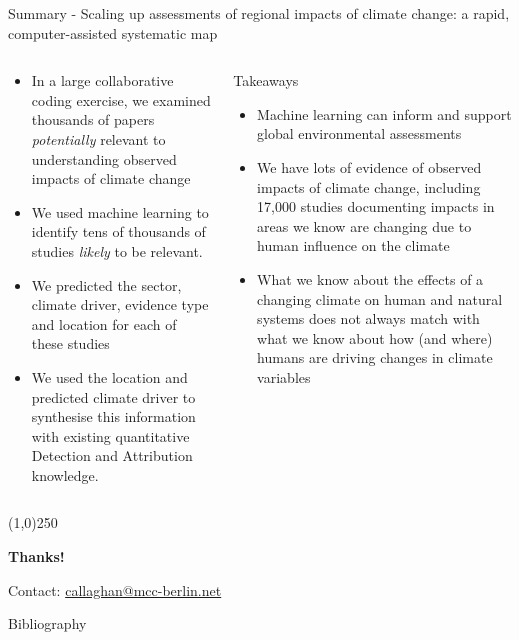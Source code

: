 \documentclass[9pt]{beamer}
\begin{document}
\begin{frame}{Summary - Scaling up assessments of regional impacts of climate change: a rapid, computer-assisted systematic map}

\begin{columns}
	\small
	\begin{column}{0.5\linewidth}
		\begin{itemize}
			\item In a large collaborative coding exercise, we examined thousands of papers \textit{potentially} relevant to understanding observed impacts of climate change
			\item We used machine learning to identify tens of thousands of studies \textit{likely} to be relevant.
			\item We predicted the sector, climate driver, evidence type and location for each of these studies
			\item We used the location and predicted climate driver to synthesise this information with existing quantitative Detection and Attribution knowledge.
		\end{itemize}
	\end{column}

	\begin{column}{0.5\linewidth}
		
		\begin{block}{Takeaways}
			\begin{itemize}
				\item Machine learning can inform and support global environmental assessments
				\item We have lots of evidence of observed impacts of climate change, including 17,000 studies documenting impacts in areas we know are changing due to human influence on the climate
				\item What we know about the effects of a changing climate on human and natural systems does not always match with what we know about how (and where) humans are driving changes in climate variables 
			\end{itemize}
		\end{block}
		
	\end{column}
\end{columns}



\begin{center}
	\line(1,0){250}
	
	\medskip
	
	\textbf{Thanks!}
	
	\medskip
	
	Contact: \url{callaghan@mcc-berlin.net}

\end{center}



\end{frame}

\begin{frame}{Bibliography}

\end{frame}
\end{document}
